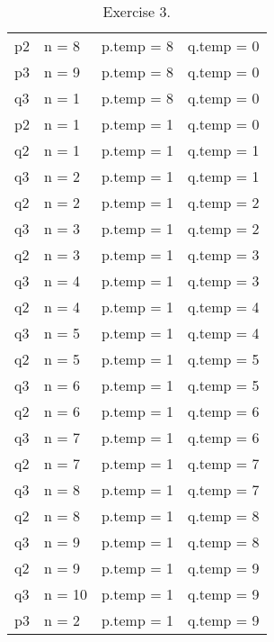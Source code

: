 \documentclass[]{article}
\begin{document}
\begin{table}[h]
\begin{tabular}{llll}
p2               & n = 8            & p.temp = 8            & q.temp = 0            \\
p3               & n = 9            & p.temp = 8            & q.temp = 0            \\
q3               & n = 1            & p.temp = 8            & q.temp = 0            \\
p2               & n = 1            & p.temp = 1            & q.temp = 0            \\
q2               & n = 1            & p.temp = 1            & q.temp = 1            \\
q3               & n = 2            & p.temp = 1            & q.temp = 1            \\
q2               & n = 2            & p.temp = 1            & q.temp = 2            \\
q3               & n = 3            & p.temp = 1            & q.temp = 2            \\
q2               & n = 3            & p.temp = 1            & q.temp = 3            \\
q3               & n = 4            & p.temp = 1            & q.temp = 3            \\
q2               & n = 4            & p.temp = 1            & q.temp = 4            \\
q3               & n = 5            & p.temp = 1            & q.temp = 4            \\
q2               & n = 5            & p.temp = 1            & q.temp = 5            \\
q3               & n = 6            & p.temp = 1            & q.temp = 5            \\
q2               & n = 6            & p.temp = 1            & q.temp = 6            \\
q3               & n = 7            & p.temp = 1            & q.temp = 6            \\
q2               & n = 7            & p.temp = 1            & q.temp = 7            \\
q3               & n = 8            & p.temp = 1            & q.temp = 7            \\
q2               & n = 8            & p.temp = 1            & q.temp = 8            \\
q3               & n = 9            & p.temp = 1            & q.temp = 8            \\
q2               & n = 9            & p.temp = 1            & q.temp = 9            \\
q3               & n = 10           & p.temp = 1            & q.temp = 9            \\
p3               & n = 2            & p.temp = 1            & q.temp = 9                      
\end{tabular}
\caption{Exercise 3.}
\end{table}
\end{document}

